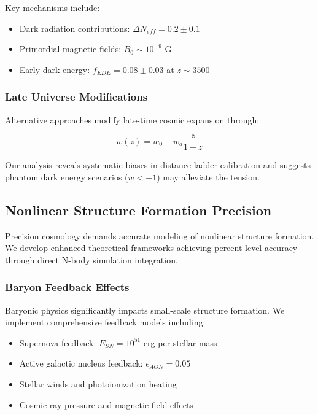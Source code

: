 \documentclass[12pt,a4paper]{article}
\begin{document}
Key mechanisms include:
\begin{itemize}
\item Dark radiation contributions: $\Delta N_{eff} = 0.2 \pm 0.1$
\item Primordial magnetic fields: $B_0 \sim 10^{-9}$ G
\item Early dark energy: $f_{EDE} = 0.08 \pm 0.03$ at $z \sim 3500$
\end{itemize}

\subsubsection{Late Universe Modifications}

Alternative approaches modify late-time cosmic expansion through:

\begin{equation}
w(z) = w_0 + w_a \frac{z}{1+z}
\end{equation}

Our analysis reveals systematic biases in distance ladder calibration and suggests phantom dark energy scenarios ($w < -1$) may alleviate the tension.

\subsection{Nonlinear Structure Formation Precision}

Precision cosmology demands accurate modeling of nonlinear structure formation. We develop enhanced theoretical frameworks achieving percent-level accuracy through direct N-body simulation integration.

\subsubsection{Baryon Feedback Effects}

Baryonic physics significantly impacts small-scale structure formation. We implement comprehensive feedback models including:

\begin{itemize}
\item Supernova feedback: $E_{SN} = 10^{51}$ erg per stellar mass
\item Active galactic nucleus feedback: $\epsilon_{AGN} = 0.05$
\item Stellar winds and photoionization heating
\item Cosmic ray pressure and magnetic field effects
\end{itemize}
\end{document}
